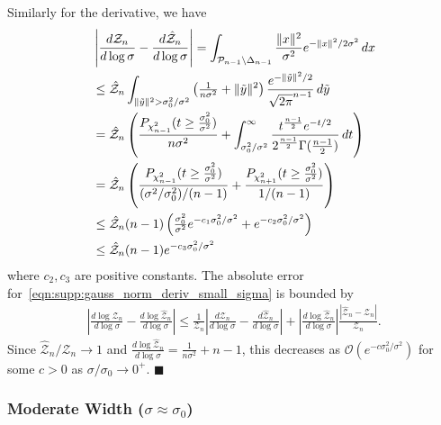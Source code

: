 Similarly for the derivative, we have
\begin{align*}
     & \left| \frac{d \mathcal{Z}_n}{d \log\sigma} - \frac{d \hat{\mathcal{Z}}_n}{d \log\sigma} \right| = \int_{\mathcal{P}_{n-1} \setminus \Delta_{n-1}} \frac{\lVert x \rVert^2}{\sigma^2} e^{ -\lVert x \rVert^2 / 2 \sigma^2 } \, dx \\
     & \le \hat{\mathcal{Z}}_n \int_{\lVert \tilde{y} \rVert^2 > \sigma_0^2 / \sigma^2} \left(\tfrac{1}{n \sigma^2} + \lVert \tilde{y} \rVert^2 \right) \frac{e^{-\lVert \tilde{y} \rVert^2 / 2}}{\sqrt{2\pi}^{n-1}} \, d\tilde{y}       \\
     & = \hat{\mathcal{Z}}_n \left( \frac{P_{\chi^2_{n-1}}( t \ge \tfrac{\sigma_0^2}{\sigma^2} )}{n \sigma^2} + \int_{\sigma_0^2 / \sigma^2}^{\infty} \frac{t^{\frac{n-1}{2}} e^{-t/2}}{2^{\frac{n-1}{2}} \Gamma(\tfrac{n-1}{2})} \, dt \right)              \\
     & = \hat{\mathcal{Z}}_n \left( \frac{P_{\chi^2_{n-1}}( t \ge \tfrac{\sigma_0^2}{\sigma^2} )}{(\sigma^2 / \sigma_0^2) / (n-1)} + \frac{P_{\chi^2_{n+1}}( t \ge \tfrac{\sigma_0^2}{\sigma^2} )}{1/(n-1)} \right)                                          \\
     & \le \hat{\mathcal{Z}}_n (n-1) \left( \tfrac{\sigma_0^2}{\sigma^2} e^{-c_1 \sigma_0^2 / \sigma^2} + e^{-c_2 \sigma_0^2 / \sigma^2}\right)                                                                                                              \\
     & \le \hat{\mathcal{Z}}_n (n-1) e^{-c_3 \sigma_0^2 / \sigma^2}
\end{align*}
where $c_2, c_3$ are positive constants.
The absolute error for~\eqref{eqn:supp:gauss_norm_deriv_small_sigma} is bounded by
\begin{align*}
    \left| \frac{d \log\mathcal{Z}_n}{d \log\sigma} - \frac{d \log\hat{\mathcal{Z}}_n}{d \log\sigma} \right|
    \le \frac{1}{\mathcal{Z}_n} \left| \frac{d \mathcal{Z}_n}{d \log\sigma} - \frac{d \hat{\mathcal{Z}}_n}{d \log\sigma} \right|
    + \left| \frac{d \log\hat{\mathcal{Z}}_n}{d \log\sigma} \right| \frac{|\hat{\mathcal{Z}}_n - \mathcal{Z}_n|}{\mathcal{Z}_n}.
\end{align*}
Since $\hat{\mathcal{Z}}_n/\mathcal{Z}_n \to 1$ and $\tfrac{d \log\hat{\mathcal{Z}}_n}{d \log\sigma} = \tfrac{1}{n\sigma^2} + n - 1$, this decreases as $\mathcal{O}(e^{-c\sigma_0^2/\sigma^2})$ for some $c>0$ as $\sigma/\sigma_0 \to 0^+$.
$\blacksquare$

\subsubsection{Moderate Width ($\sigma \approx \sigma_0$)}


